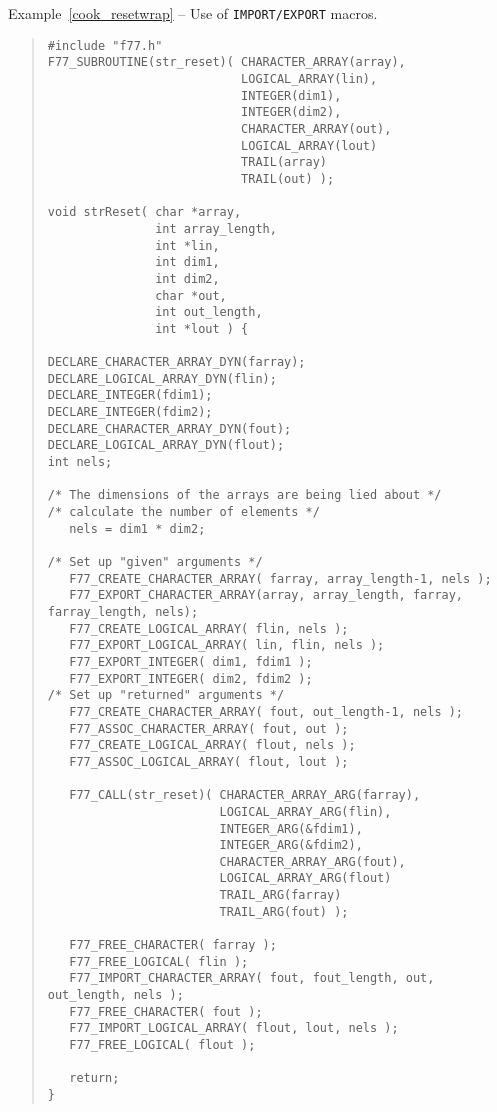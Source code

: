 \documentclass[twoside,11pt]{article}
\newcommand{\latex}[1]{#1}
\renewcommand{\_}{\texttt{\symbol{95}}}
\newcounter{examples}
\begin{document}
\label{cook_resetwrap}
\begin{center}
Example\latex{~\ref{cook_resetwrap}}
-- Use of \texttt{IMPORT/EXPORT} macros\@.
\end{center}
{\small \begin{quote} \begin{verbatim}
#include "f77.h"
F77_SUBROUTINE(str_reset)( CHARACTER_ARRAY(array),
                           LOGICAL_ARRAY(lin),
                           INTEGER(dim1),
                           INTEGER(dim2),
                           CHARACTER_ARRAY(out),
                           LOGICAL_ARRAY(lout)
                           TRAIL(array)
                           TRAIL(out) );

void strReset( char *array,
               int array_length,
               int *lin,
               int dim1,
               int dim2,
               char *out,
               int out_length,
               int *lout ) {

DECLARE_CHARACTER_ARRAY_DYN(farray);
DECLARE_LOGICAL_ARRAY_DYN(flin);
DECLARE_INTEGER(fdim1);
DECLARE_INTEGER(fdim2);
DECLARE_CHARACTER_ARRAY_DYN(fout);
DECLARE_LOGICAL_ARRAY_DYN(flout);
int nels;

/* The dimensions of the arrays are being lied about */
/* calculate the number of elements */
   nels = dim1 * dim2;

/* Set up "given" arguments */
   F77_CREATE_CHARACTER_ARRAY( farray, array_length-1, nels );
   F77_EXPORT_CHARACTER_ARRAY(array, array_length, farray, farray_length, nels);
   F77_CREATE_LOGICAL_ARRAY( flin, nels );
   F77_EXPORT_LOGICAL_ARRAY( lin, flin, nels );
   F77_EXPORT_INTEGER( dim1, fdim1 );
   F77_EXPORT_INTEGER( dim2, fdim2 );
/* Set up "returned" arguments */
   F77_CREATE_CHARACTER_ARRAY( fout, out_length-1, nels );
   F77_ASSOC_CHARACTER_ARRAY( fout, out );
   F77_CREATE_LOGICAL_ARRAY( flout, nels );
   F77_ASSOC_LOGICAL_ARRAY( flout, lout );

   F77_CALL(str_reset)( CHARACTER_ARRAY_ARG(farray),
                        LOGICAL_ARRAY_ARG(flin),
                        INTEGER_ARG(&fdim1),
                        INTEGER_ARG(&fdim2),
                        CHARACTER_ARRAY_ARG(fout),
                        LOGICAL_ARRAY_ARG(flout)
                        TRAIL_ARG(farray)
                        TRAIL_ARG(fout) );

   F77_FREE_CHARACTER( farray );
   F77_FREE_LOGICAL( flin );
   F77_IMPORT_CHARACTER_ARRAY( fout, fout_length, out, out_length, nels );
   F77_FREE_CHARACTER( fout );
   F77_IMPORT_LOGICAL_ARRAY( flout, lout, nels );
   F77_FREE_LOGICAL( flout );

   return;
}
\end{verbatim} \end{quote} }
\end{document}
